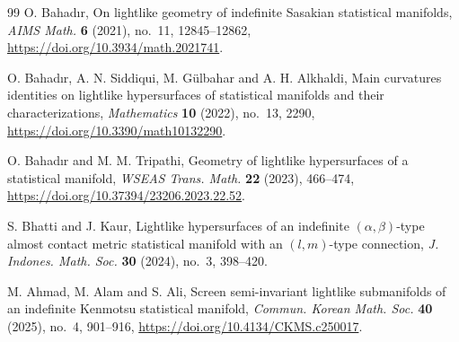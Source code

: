 \documentclass[11pt,a4paper]{article}
\theoremstyle{remark}
\theoremstyle{definition}
\begin{document}
\begin{thebibliography}{99}
O. Bahad{\i}r,
On lightlike geometry of indefinite Sasakian statistical manifolds,
\textit{AIMS Math.} \textbf{6} (2021), no.~11, 12845--12862,
\url{https://doi.org/10.3934/math.2021741}.

O. Bahad{\i}r, A. N. Siddiqui, M. G\"ulbahar and A. H. Alkhaldi,
Main curvatures identities on lightlike hypersurfaces of statistical
manifolds and their characterizations,
\textit{Mathematics} \textbf{10} (2022), no.~13, 2290,
\url{https://doi.org/10.3390/math10132290}.

O. Bahad{\i}r and M. M. Tripathi,
Geometry of lightlike hypersurfaces of a statistical manifold,
\textit{WSEAS Trans. Math.} \textbf{22} (2023), 466--474,
\url{https://doi.org/10.37394/23206.2023.22.52}.

S. Bhatti and J. Kaur,
Lightlike hypersurfaces of an indefinite $(\alpha,\beta)$-type almost
contact metric statistical manifold with an $(l,m)$-type connection,
\textit{J. Indones. Math. Soc.} \textbf{30} (2024), no.~3, 398--420.

M. Ahmad, M. Alam and S. Ali,
Screen semi-invariant lightlike submanifolds of an indefinite Kenmotsu
statistical manifold,
\textit{Commun. Korean Math. Soc.} \textbf{40} (2025), no.~4, 901--916,
\url{https://doi.org/10.4134/CKMS.c250017}.

\end{thebibliography}
\end{document}
